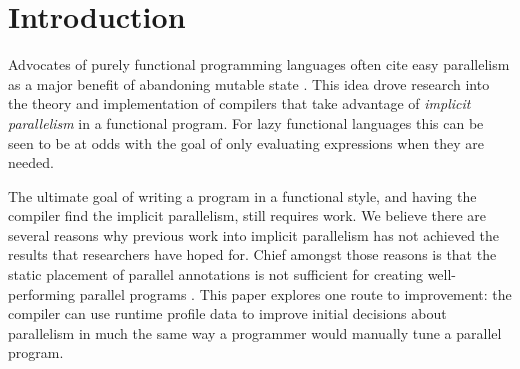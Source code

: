 %
%
%

%
%
%

\section{Introduction}
\label{section:Introduction}


Advocates of purely functional programming languages often cite easy
parallelism as a major benefit of abandoning mutable state \citep{hughes:thesis,
SPJ:PIFPL}. This idea drove research into the theory and implementation of
compilers that take advantage of \emph{implicit parallelism} in a functional
program. For lazy functional languages this can be seen to be at odds with the
goal of only evaluating expressions when they are needed. 

The ultimate goal of writing a program in a functional style, and having the
compiler find the implicit parallelism, still requires work.  We believe there
are several reasons why previous work into implicit parallelism has not
achieved the results that researchers have hoped for. Chief amongst those
reasons is that the static placement of parallel annotations is not sufficient
for creating well-performing parallel programs \citep{hammond2000research,
hogen1992automatic, tremblay1995impact, feedbackImplicit}. This paper explores
one route to improvement: the compiler can use runtime profile data to improve
initial decisions about parallelism in much the same way a programmer would
manually tune a parallel program.

